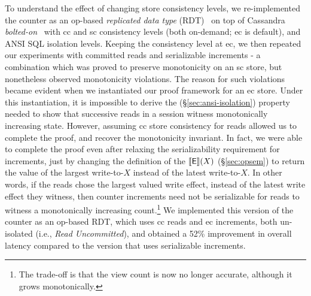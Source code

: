To understand the effect of changing store consistency levels, we
re-implemented the counter as an op-based \emph{replicated data type}
(RDT)~\cite{crdt,burckhardt14} on top of Cassandra
\emph{bolted-on}~\cite{bailisbolton} with {\sc cc} and {\sc sc}
consistency levels (both on-demand; {\sc ec} is default), and ANSI SQL
isolation levels. Keeping the consistency level at {\sc ec}, we then
repeated our experiments with committed reads and serializable
increments - a combination which was proved to preserve monotonicity
on an {\sc sc} store, but nonetheless observed monotonicity
violations. The reason for such violations became evident when
we instantiated our proof framework for an {\sc ec} store.
Under this instantiation, it is impossible to derive the
 (\S\ref{sec:ansi-isolation}) property needed to show
that successive reads in a session witness monotonically increasing
state. However, assuming {\sc cc} store consistency for reads allowed
us to complete the proof, and recover the monotonicity invariant. In
fact, we were able to complete the proof even after relaxing the
serializability requirement for increments, just by changing the
definition of the $\llbracket \textsf{E} \rrbracket(X)$ (\S\ref{sec:opsem}) to return the
value of the largest write-to-$X$ instead of the latest write-to-$X$.
In other words, if the reads chose the largest valued write effect,
instead of the latest write effect they witness, then counter
increments need not be serializable for reads to witness a
monotonically increasing count.\footnote{The trade-off is that the view
count is now no longer accurate, although it grows monotonically.}
We implemented this version of the counter as an op-based RDT, which
uses {\sc cc} reads and {\sc ec} increments, both un-isolated (i.e.,
\emph{Read Uncommitted}), and obtained a 52\% improvement in overall
latency compared to the version that uses serializable increments.
\vspace*{-3pt}
